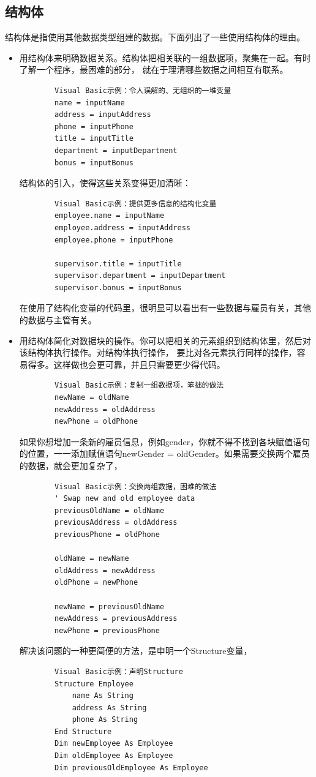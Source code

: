 \documentclass{article}
\begin{document}
\subsection{结构体}
结构体是指使用其他数据类型组建的数据。下面列出了一些使用结构体的理由。
\begin{itemize}
    \item 用结构体来明确数据关系。结构体把相关联的一组数据项，聚集在一起。有时了解一个程序，最困难的部分，
    就在于理清哪些数据之间相互有联系。
    \begin{lstlisting}
        Visual Basic示例：令人误解的、无组织的一堆变量
        name = inputName
        address = inputAddress
        phone = inputPhone
        title = inputTitle
        department = inputDepartment
        bonus = inputBonus
    \end{lstlisting}
    结构体的引入，使得这些关系变得更加清晰：
    \begin{lstlisting}
        Visual Basic示例：提供更多信息的结构化变量
        employee.name = inputName
        employee.address = inputAddress
        employee.phone = inputPhone

        supervisor.title = inputTitle
        supervisor.department = inputDepartment
        supervisor.bonus = inputBonus
    \end{lstlisting}
    在使用了结构化变量的代码里，很明显可以看出有一些数据与雇员有关，其他的数据与主管有关。
    \item 用结构体简化对数据块的操作。你可以把相关的元素组织到结构体里，然后对该结构体执行操作。对结构体执行操作，
    要比对各元素执行同样的操作，容易得多。这样做也会更可靠，并且只需要更少得代码。
    \begin{lstlisting}
        Visual Basic示例：复制一组数据项，笨拙的做法
        newName = oldName
        newAddress = oldAddress
        newPhone = oldPhone
    \end{lstlisting}
    如果你想增加一条新的雇员信息，例如gender，你就不得不找到各块赋值语句的位置，一一添加赋值语句newGender
    = oldGender。如果需要交换两个雇员的数据，就会更加复杂了，
    \begin{lstlisting}
        Visual Basic示例：交换两组数据，困难的做法
        ' Swap new and old employee data
        previousOldName = oldName
        previousAddress = oldAddress
        previousPhone = oldPhone

        oldName = newName
        oldAddress = newAddress
        oldPhone = newPhone

        newName = previousOldName
        newAddress = previousAddress
        newPhone = previousPhone
    \end{lstlisting}
    解决该问题的一种更简便的方法，是申明一个Structure变量，
    \begin{lstlisting}
        Visual Basic示例：声明Structure
        Structure Employee
            name As String
            address As String
            phone As String
        End Structure
        Dim newEmployee As Employee
        Dim oldEmployee As Employee
        Dim previousOldEmployee As Employee


\end{lstlisting}
\end{itemize}
\end{document}
